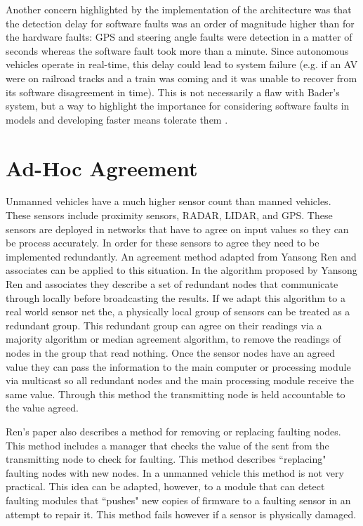 \documentclass[twoside, conference]{IEEEtran}
\begin{document}
Another concern highlighted by the implementation of the architecture was that the detection delay for software faults was an order of magnitude higher than for the hardware faults: GPS and steering angle faults were detection in a matter of seconds whereas the software fault took more than a minute. Since autonomous vehicles operate in real-time, this delay could lead to system failure (e.g. if an AV were on railroad tracks and a train was coming and it was unable to recover from its software disagreement in time). This is not necessarily a flaw with Bader's system, but a way to highlight the importance for considering software faults in models and developing faster means tolerate them \cite{Bader2014}.	
	
\section{Ad-Hoc Agreement}\label{sec:adhoc-agreement}
Unmanned vehicles have a much higher sensor count than manned vehicles. These sensors include proximity sensors, RADAR, LIDAR, and GPS. These sensors are deployed in networks that have to agree on input values so they can be process accurately. In order for these sensors to agree they need to be implemented redundantly. An agreement method adapted from Yansong Ren and associates can be applied to this situation. In the algorithm proposed by Yansong Ren and associates they describe a set of redundant nodes that communicate through locally before broadcasting the results. If we adapt this algorithm to a real world sensor net the, a physically local group of sensors can be treated as a redundant group. This redundant group can agree on their readings via a majority algorithm or median agreement algorithm, to remove the readings of nodes in the group that read nothing. Once the sensor nodes have an agreed value they can pass the information to the main computer or processing module via multicast so all redundant nodes and the main processing module receive the same value. Through this method the transmitting node is held accountable to the value agreed.\cite{Ren2001}

Ren's paper also describes a method for removing or replacing faulting nodes. This method includes a manager that checks the value of the sent from the transmitting node to check for faulting. This method describes ``replacing" faulting nodes with new nodes. In a unmanned vehicle this method is not very practical. This idea can be adapted, however, to a module that can detect faulting modules that ``pushes" new copies of firmware to a faulting sensor in an attempt to repair it. This method fails however if a sensor is physically damaged.\cite{Ren2001}
\end{document}
